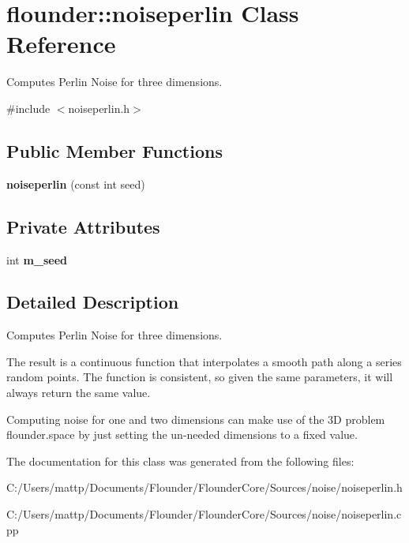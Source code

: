 \hypertarget{classflounder_1_1noiseperlin}{}\section{flounder\+:\+:noiseperlin Class Reference}
\label{classflounder_1_1noiseperlin}


Computes Perlin Noise for three dimensions.  




{\ttfamily \#include $<$noiseperlin.\+h$>$}

\subsection*{Public Member Functions}
\begin{DoxyCompactItemize}
\item 
\mbox{\label{classflounder_1_1noiseperlin_aa3f23285b751f7a2cd19251b5bbbc15a}} 
{\bfseries noiseperlin} (const int seed)
\end{DoxyCompactItemize}
\subsection*{Private Attributes}
\begin{DoxyCompactItemize}
\item 
\mbox{\label{classflounder_1_1noiseperlin_ab1bc948f429338f3126592040f8831e7}} 
int {\bfseries m\+\_\+seed}
\end{DoxyCompactItemize}


\subsection{Detailed Description}
Computes Perlin Noise for three dimensions. 

The result is a continuous function that interpolates a smooth path along a series random points. The function is consistent, so given the same parameters, it will always return the same value. 

Computing noise for one and two dimensions can make use of the 3D problem flounder.\+space by just setting the un-\/needed dimensions to a fixed value. 

The documentation for this class was generated from the following files\+:\begin{DoxyCompactItemize}
\item 
C\+:/\+Users/mattp/\+Documents/\+Flounder/\+Flounder\+Core/\+Sources/noise/noiseperlin.\+h\item 
C\+:/\+Users/mattp/\+Documents/\+Flounder/\+Flounder\+Core/\+Sources/noise/noiseperlin.\+cpp\end{DoxyCompactItemize}

